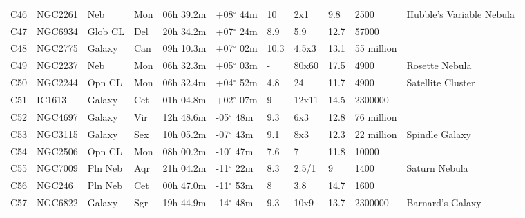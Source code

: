 \documentclass[10pt,twoside,a4paper,english]{article}
\begin{document}
\begin{longtable}{@{}lllllllllll@{}}
C46        & NGC2261     & Neb        & Mon       & 06h 39.2m & +08$^{\circ}$ 44m  & 10        & 2x1                  & 9.8      & 2500                & Hubble's Variable Nebula        \\ 
C47        & NGC6934     & Glob CL    & Del       & 20h 34.2m & +07$^{\circ}$ 24m  & 8.9       & 5.9                  & 12.7     & 57000               &                                 \\ 
C48        & NGC2775     & Galaxy     & Can       & 09h 10.3m & +07$^{\circ}$ 02m  & 10.3      & 4.5x3                & 13.1     & 55 million          &                                 \\ 
C49        & NGC2237    & Neb        & Mon       & 06h 32.3m & +05$^{\circ}$ 03m  & -         & 80x60                & 17.5     & 4900                & Rosette Nebula                  \\ 
C50        & NGC2244     & Opn CL     & Mon       & 06h 32.4m & +04$^{\circ}$ 52m  & 4.8       & 24                   & 11.7     & 4900                & Satellite Cluster               \\ 
C51        & IC1613      & Galaxy     & Cet       & 01h 04.8m & +02$^{\circ}$ 07m  & 9         & 12x11                & 14.5     & 2300000             &                                 \\ 
C52        & NGC4697     & Galaxy     & Vir       & 12h 48.6m & -05$^{\circ}$ 48m  & 9.3       & 6x3                  & 12.8     & 76 million          &                                 \\ 
C53        & NGC3115     & Galaxy     & Sex       & 10h 05.2m & -07$^{\circ}$ 43m  & 9.1       & 8x3                  & 12.3     & 22 million          & Spindle Galaxy                  \\ 
C54        & NGC2506     & Opn CL     & Mon       & 08h 00.2m & -10$^{\circ}$ 47m  & 7.6       & 7                    & 11.8     & 10000               &                                 \\ 
C55        & NGC7009     & Pln Neb    & Aqr       & 21h 04.2m & -11$^{\circ}$ 22m  & 8.3       & 2.5/1                & 9        & 1400                & Saturn Nebula                   \\ 
C56        & NGC246      & Pln Neb    & Cet       & 00h 47.0m & -11$^{\circ}$ 53m  & 8         & 3.8                  & 14.7     & 1600                &                                 \\ 
C57        & NGC6822     & Galaxy     & Sgr       & 19h 44.9m & -14$^{\circ}$ 48m  & 9.3       & 10x9                 & 13.7     & 2300000             & Barnard's Galaxy                \\ 

\end{longtable}
\end{document}
